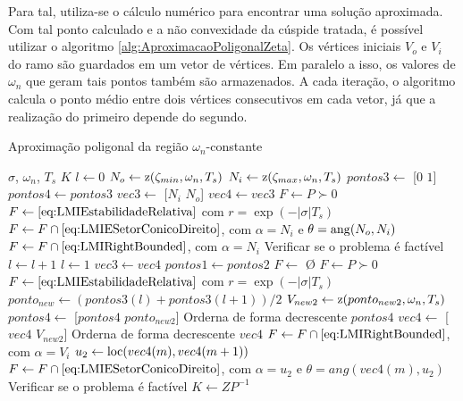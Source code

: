 Para tal, utiliza-se o cálculo numérico para encontrar uma solução aproximada. Com tal ponto calculado e a não convexidade da cúspide tratada, é possível utilizar o algoritmo \ref{alg:AproximacaoPoligonalZeta}. Os vértices iniciais $V_o$ e $V_i$ do ramo são guardados em um vetor de vértices. Em paralelo a isso, os valores de $\omega_n$ que geram tais pontos também são armazenados. A cada iteração, o algoritmo calcula o ponto médio entre dois vértices consecutivos em cada vetor, já que a realização do primeiro depende do segundo.

\begin{algorithm}[!ht]
  \caption{Aproximação poligonal da região $\omega_n$-constante}\label{alg:AproximacaoPoligonalWn}
  \begin{algorithmic}[1]
    \Require $\sigma$, $\omega_n$, $T_s$
    \Ensure $K$
    \State $l \gets 0$
    \State $N_o \gets \operatorname{\mathrm{z}}(\zeta_{min},\omega_n,T_s)$
    \State $N_i \gets \operatorname{\mathrm{z}}(\zeta_{max},\omega_n,T_s)$
    \State $pontos3 \gets$ [$0$ $1$]
    \State $pontos4 \gets pontos3$
    \State $vec3 \gets$ [$N_i$ $N_o$]
    \State $vec4 \gets vec3$
    \State $F \gets P \succ 0$
    \State $F \gets \eqref{eq:LMIEstabilidadeRelativa}$ com $r = \exp{\left(-|\sigma|T_s\right)}$ 
    \State $F \gets F \cap \eqref{eq:LMIESetorConicoDireito}$, com $\alpha = N_i$ e $\theta = \operatorname{ang}(N_o,N_i)$ 
    \State $F \gets F \cap \eqref{eq:LMIRightBounded}$, com $\alpha = N_i$ 
    \State Verificar se o problema é factível
        \State $l \gets l + 1$
      \Else
        \State $l \gets 1$
        \State $vec3 \gets vec4$
        \State $pontos1 \gets pontos2$
      \EndIf
        \State $F \gets$ \O {}
        \State $F \gets P \succ 0$
        \State $F \gets \eqref{eq:LMIEstabilidadeRelativa}$ com $r = \exp{\left(-|\sigma|T_s\right)}$ 
        \State $ponto_{new} \gets (pontos3(l)+pontos3(l+1))/2$
        \State $V_{new2} \gets \operatorname{\mathrm{z}}(ponto_{new2}, \omega_n, T_s)$
        \State $pontos4 \gets$ [$pontos4$ $ponto_{new2}$]
        \State Orderna de forma decrescente $pontos4$
        \State $vec4 \gets$ [$vec4$ $V_{new2}$]
        \State Orderna de forma decrescente $vec4$
        \State $F \gets F \cap \eqref{eq:LMIRightBounded}$, com $\alpha = V_i$ 
          \State $u_2 \gets \operatorname{loc}(vec4(m),vec4(m+1))$
          \State $F \gets F \cap \eqref{eq:LMIESetorConicoDireito}$, com $\alpha = u_2$ e $\theta = ang(vec4(m),u_2)$
        \EndFor
        \State Verificar se o problema é factível
    \EndWhile
    \State $K \gets ZP^{-1}$
  \end{algorithmic}
\end{algorithm}

